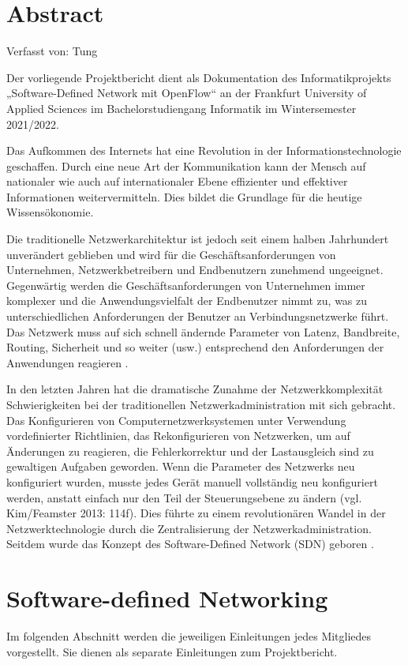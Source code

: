 \documentclass[fontsize=12pt,paper=a4,open=any,parskip=half,
  twoside=false,toc=listof,toc=bibliography,fleqn,leqno,
  captions=nooneline,captions=tableabove,british]{scrbook}
\begin{document}
\chapter{Abstract}
{\tiny Verfasst von: Tung\par}
Der vorliegende Projektbericht dient als Dokumentation des Informatikprojekts „Software-Defined Network mit OpenFlow“ an der Frankfurt University of Applied Sciences im Bachelorstudiengang Informatik im Wintersemester 2021/2022.\par
Das Aufkommen des Internets hat eine Revolution in der Informationstechnologie geschaffen. Durch eine neue Art der Kommunikation kann der Mensch auf nationaler wie auch auf internationaler Ebene effizienter und effektiver Informationen weitervermitteln. Dies bildet die Grundlage für die heutige Wissensökonomie.\par
Die traditionelle Netzwerkarchitektur ist jedoch seit einem halben Jahrhundert unverändert geblieben und wird für die Geschäftsanforderungen von Unternehmen, Netzwerkbetreibern und Endbenutzern zunehmend ungeeignet. Gegenwärtig werden die Geschäftsanforderungen von Unternehmen immer komplexer und die Anwendungsvielfalt der Endbenutzer nimmt zu, was zu unterschiedlichen Anforderungen der Benutzer an Verbindungsnetzwerke führt. Das Netzwerk muss auf sich schnell ändernde Parameter von Latenz, Bandbreite, Routing, Sicherheit und so weiter (usw.) entsprechend den Anforderungen der Anwendungen reagieren \cite{case}.\par
In den letzten Jahren hat die dramatische Zunahme der Netzwerkkomplexität Schwierigkeiten bei der traditionellen Netzwerkadministration mit sich gebracht. Das Konfigurieren von Computernetzwerksystemen unter Verwendung vordefinierter Richtlinien, das Rekonfigurieren von Netzwerken, um auf Änderungen zu reagieren, die Fehlerkorrektur und der Lastausgleich sind zu gewaltigen Aufgaben geworden. Wenn die Parameter des Netzwerks neu konfiguriert wurden, musste jedes Gerät manuell vollständig neu konfiguriert werden, anstatt einfach nur den Teil der Steuerungsebene zu ändern (vgl. Kim/Feamster 2013: 114f). Dies führte zu einem revolutionären Wandel in der Netzwerktechnologie durch die Zentralisierung der Netzwerkadministration. Seitdem wurde das Konzept des Software-Defined Network (SDN) geboren \cite[114-115]{improve}. 

\mainmatter %
\chapter{Software-defined Networking}\label{sdn}
Im folgenden Abschnitt werden die jeweiligen Einleitungen jedes Mitgliedes vorgestellt. Sie dienen als separate Einleitungen zum Projektbericht.
\end{document}
